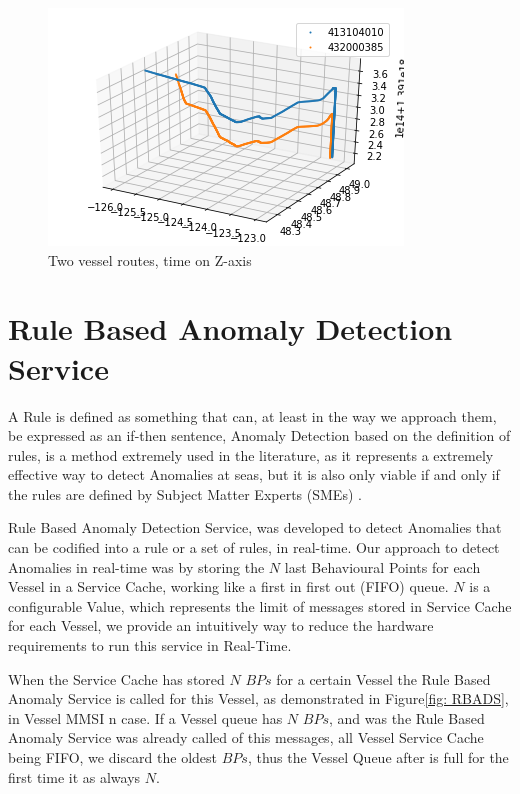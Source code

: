 \begin{figure}[H]
	\centering
	\includegraphics[scale = .9]{figures/VesselRendevouz3d}
    \caption{Two vessel routes, time on Z-axis}
    \label{fig: VesselRendevouz3d}
\end{figure}


\section{Rule Based Anomaly Detection Service}
A Rule is defined as something that can, at least in the way we approach them, be expressed as an if-then sentence, \cite{Edlund2006titleRule-basedSurveillance/title}
Anomaly Detection based on the definition of rules, is a method extremely used in the literature, as it represents a extremely effective way to detect Anomalies at seas, but it is also only viable if and only if the rules are defined by Subject Matter Experts (SMEs) \cite{Boinepalli2014AAlgorithm, Will2011FastProcesses}.

Rule Based Anomaly Detection Service, was developed to detect Anomalies that can be codified into a rule or a set of rules, in real-time. 
Our approach to detect Anomalies in real-time was by storing the $N$ last Behavioural Points for each Vessel in a Service Cache, working like a first in first out (FIFO) queue. $N$ is a configurable Value, which represents the limit of messages stored in Service Cache for each Vessel, we provide an intuitively way to reduce the hardware requirements to run this service in Real-Time.

When the Service Cache has stored $N$ $BPs$ for a certain Vessel the Rule Based Anomaly Service is called for this Vessel, as demonstrated in Figure\ref{fig: RBADS}, in Vessel MMSI n case.
If a Vessel queue has $N$ $BPs$, and was the Rule Based Anomaly Service was already called of this messages, all Vessel Service Cache being FIFO, we discard the oldest $BPs$, thus the Vessel Queue after is full for the first time it as always $N$.

